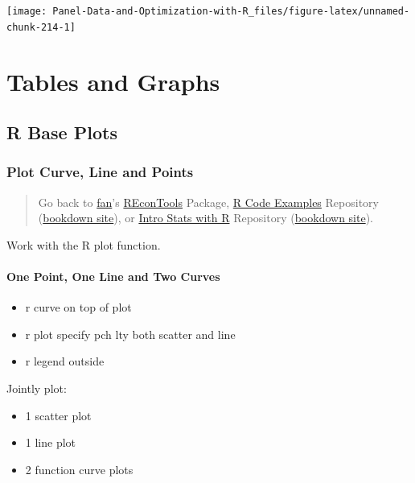 \documentclass[
]{book}
\providecommand{\tightlist}{%
  \setlength{\itemsep}{0pt}\setlength{\parskip}{0pt}}
\begin{document}
\begin{center}\texttt{[image: Panel-Data-and-Optimization-with-R\_files/figure-latex/unnamed-chunk-214-1]} \end{center}

\hypertarget{tables-and-graphs}{%
\chapter{Tables and Graphs}\label{tables-and-graphs}}

\hypertarget{r-base-plots}{%
\section{R Base Plots}\label{r-base-plots}}

\hypertarget{plot-curve-line-and-points}{%
\subsection{Plot Curve, Line and Points}\label{plot-curve-line-and-points}}

\begin{quote}
Go back to \href{http://fanwangecon.github.io/}{fan}'s \href{https://fanwangecon.github.io/REconTools/}{REconTools} Package, \href{https://fanwangecon.github.io/R4Econ/}{R Code Examples} Repository (\href{https://fanwangecon.github.io/R4Econ/bookdown}{bookdown site}), or \href{https://fanwangecon.github.io/Stat4Econ/}{Intro Stats with R} Repository (\href{https://fanwangecon.github.io/Stat4Econ/bookdown}{bookdown site}).
\end{quote}

Work with the R plot function.

\hypertarget{one-point-one-line-and-two-curves}{%
\subsubsection{One Point, One Line and Two Curves}\label{one-point-one-line-and-two-curves}}

\begin{itemize}
\tightlist
\item
  r curve on top of plot
\item
  r plot specify pch lty both scatter and line
\item
  r legend outside
\end{itemize}

Jointly plot:

\begin{itemize}
\tightlist
\item
  1 scatter plot
\item
  1 line plot
\item
  2 function curve plots
\end{itemize}
\end{document}
